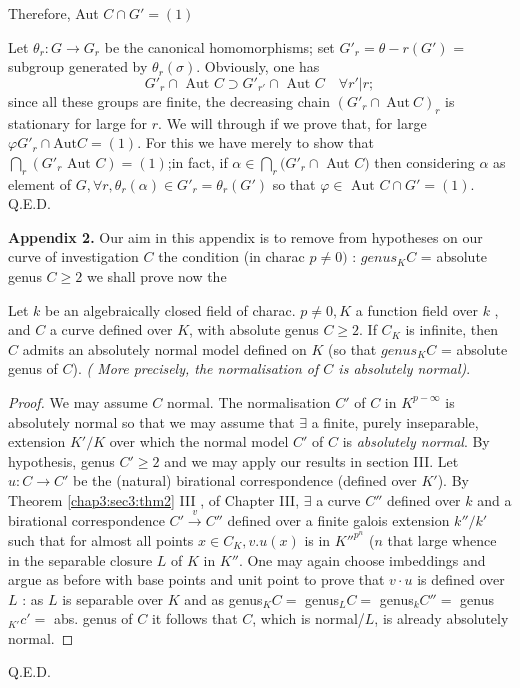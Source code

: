Therefore, Aut $C\cap G' = (1)$

Let $\theta _r : G \rightarrow G_r$ be the canonical homomorphisms; set
$ G'_r = \theta -r( G') $ = subgroup generated by $\theta _r( \sigma
)$.  Obviously, one has  
$$
G'_r \cap \text{ Aut } C \supset G'_{r'}\cap  \text{ Aut } C \quad
\forall r'| r; 
$$
since all these groups are finite, the decreasing chain $(G'_r \cap ~\text{Aut}~
C)_r$ is stationary for large for $r$. We will through if we prove
that, for  large $\varphi G'_r \cap \text{Aut} C = (1)$. For this we
have merely to show that $\bigcap\limits_{r} (G'_r  \text{ Aut } C) =
(1)$;\pageoriginale in fact, if $ \alpha  \in\bigcap\limits_{r} (G'_r \cap$ Aut $ C)$
then considering $\alpha  $ as element of $G, \forall r, \theta _r( \alpha ) \in
G'_r = \theta _r (G')$ so that $\varphi \in \text{ Aut } C \cap G' =
(1)$.  \hfill{Q.E.D.}

\medskip
\noindent 
\textbf{Appendix 2. } Our aim in this appendix is to remove from
hypotheses  on our curve of investigation $C$  the condition  (in
charac  $p \neq 0)$ : $ genus_K  C$ = absolute genus $ C \geq 2 $ we
shall prove now the  
 
\begin{theorem*}%
  Let $k$ be an algebraically closed field of charac. $ p \neq 0, K$ a
  function field over $k$ , and  $C$ a curve defined over $K$, with
  absolute genus $ C \geq 2 $. If $C_K$ is infinite, then  $C$ admits
  an absolutely normal model defined on $K$ (so that $genus_K C$ =
  absolute genus of $C$).  \textit{( More precisely, the normalisation
  of $C$ is absolutely normal)}. 
\end{theorem*}

\begin{proof} %
  We may assume $C$ normal. The normalisation $C'$ of $C$ in
  $K^{p-\infty}$ is absolutely normal so that we  may assume that
  $\exists$ a finite, purely inseparable, extension $K'/K $ over which
  the normal model $C'$ of $C$ is \textit{absolutely normal}. By
  hypothesis, genus  $C'\geq 2$  and we may apply our results in
  section III. Let $u : C \rightarrow C'$ be the (natural)
  birational correspondence (defined over $K'$). By
  Theorem \ref{chap3:sec3:thm2} III ,
  of Chapter III, $\exists$ a curve $C''$ defined over $k$ and a
  birational correspondence $C' \overset{v}\rightarrow C'' $ defined
  over a finite galois extension ${k''}/{k'}$ such that for almost all
  points $ x \in C_K , v.u (x)$ is  in $K''^{p^n}$ ($n$ that large
  whence in the separable closure $L$ of  $K$ in $K''$. One may again choose\pageoriginale
  imbeddings and argue as before with base  points and unit point to
  prove that $v \cdot u$ is defined over  $L$ : as $L$ is separable over
  $K$ and as genus$_K C=$ genus$_L C =$ genus$_k C'' =$ genus$_{K'}
  c'=$ abs. genus of 
  $C$  it follows that $C$, which is normal/$L$, is already absolutely
  normal.  
\end{proof}
\hfill {Q.E.D.}

